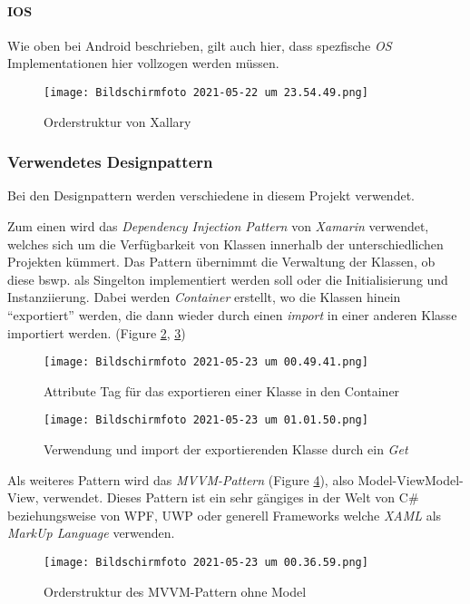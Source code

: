 \paragraph{IOS} Wie oben bei Android beschrieben, gilt auch hier, dass spezfische \textit{OS} Implementationen hier vollzogen werden müssen.
\begin{figure}[hbt!]
    \centering
    \texttt{[image: Bildschirmfoto 2021-05-22 um 23.54.49.png]}
    \caption{Orderstruktur von Xallary}
    \label{fig:Ordnerstruktur}
\end{figure}

\subsubsection{Verwendetes Designpattern}
Bei den Designpattern werden verschiedene in diesem Projekt verwendet. 

Zum einen wird das \textit{Dependency Injection Pattern} von \textit{Xamarin} verwendet, welches sich um die Verfügbarkeit von Klassen innerhalb
der unterschiedlichen Projekten kümmert. Das Pattern übernimmt die Verwaltung der Klassen, ob diese bswp. als Singelton implementiert werden soll oder
die Initialisierung und Instanziierung. Dabei werden \textit{Container} erstellt, wo die Klassen
hinein "`exportiert"'  werden, die dann wieder durch einen \textit{import} in einer anderen Klasse
importiert werden. (Figure \ref{fig:IoC}, \ref{fig:IoCImport}) 
\begin{figure}[hbt!]
    \centering
    \texttt{[image: Bildschirmfoto 2021-05-23 um 00.49.41.png]}
    \caption{Attribute Tag für das exportieren einer Klasse in den Container}
    \label{fig:IoC}
\end{figure}

\begin{figure}[hbt!]
    \centering
    \texttt{[image: Bildschirmfoto 2021-05-23 um 01.01.50.png]}
    \caption{Verwendung und import der exportierenden Klasse durch ein \textit{Get} }
    \label{fig:IoCImport}
\end{figure}

Als weiteres Pattern wird das \textit{MVVM-Pattern} (Figure \ref{fig:MVVMPattern}), also Model-ViewModel-View, verwendet.
Dieses Pattern ist ein sehr gängiges in der Welt von C\# beziehungsweise von WPF, UWP oder generell Frameworks welche \textit{XAML} als 
\textit{MarkUp Language} verwenden.
\begin{figure}[hbt!]
    \centering
    \texttt{[image: Bildschirmfoto 2021-05-23 um 00.36.59.png]}
    \caption{Orderstruktur des MVVM-Pattern ohne Model}
    \label{fig:MVVMPattern}
\end{figure}

